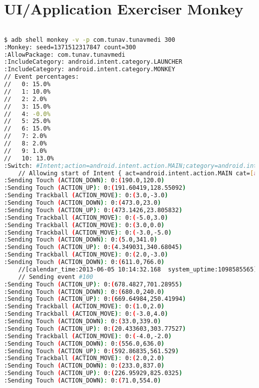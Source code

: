 \appendix

\chapter{UI/Application Exerciser Monkey}
\label{chptr:monkey}

\begin{lstlisting}[language=bash, label=lst:adb_monkey, caption=Utilisation de l'UI/Application Exerciser Monkey]

$ adb shell monkey -v -p com.tunav.tunavmedi 300
:Monkey: seed=1371512317847 count=300
:AllowPackage: com.tunav.tunavmedi
:IncludeCategory: android.intent.category.LAUNCHER
:IncludeCategory: android.intent.category.MONKEY
// Event percentages:
//   0: 15.0%
//   1: 10.0%
//   2: 2.0%
//   3: 15.0%
//   4: -0.0%
//   5: 25.0%
//   6: 15.0%
//   7: 2.0%
//   8: 2.0%
//   9: 1.0%
//   10: 13.0%
:Switch: #Intent;action=android.intent.action.MAIN;category=android.intent.category.LAUNCHER;launchFlags=0x10200000;component=com.tunav.tunavmedi/.activity.MainActivity;end
    // Allowing start of Intent { act=android.intent.action.MAIN cat=[android.intent.category.LAUNCHER] cmp=com.tunav.tunavmedi/.activity.MainActivity } in package com.tunav.tunavmedi
:Sending Touch (ACTION_DOWN): 0:(190.0,120.0)
:Sending Touch (ACTION_UP): 0:(191.60419,128.55092)
:Sending Trackball (ACTION_MOVE): 0:(3.0,-3.0)
:Sending Touch (ACTION_DOWN): 0:(473.0,23.0)
:Sending Touch (ACTION_UP): 0:(473.1426,23.805832)
:Sending Trackball (ACTION_MOVE): 0:(-5.0,3.0)
:Sending Trackball (ACTION_MOVE): 0:(3.0,0.0)
:Sending Trackball (ACTION_MOVE): 0:(-3.0,-5.0)
:Sending Touch (ACTION_DOWN): 0:(5.0,341.0)
:Sending Touch (ACTION_UP): 0:(4.349031,340.68045)
:Sending Trackball (ACTION_MOVE): 0:(2.0,-3.0)
:Sending Touch (ACTION_DOWN): 0:(611.0,766.0)
    //[calendar_time:2013-06-05 10:14:32.168  system_uptime:1098585565]
    // Sending event #100
:Sending Touch (ACTION_UP): 0:(678.4827,701.28955)
:Sending Touch (ACTION_DOWN): 0:(680.0,240.0)
:Sending Touch (ACTION_UP): 0:(669.64984,250.41994)
:Sending Trackball (ACTION_MOVE): 0:(1.0,2.0)
:Sending Trackball (ACTION_MOVE): 0:(-3.0,4.0)
:Sending Touch (ACTION_DOWN): 0:(33.0,339.0)
:Sending Touch (ACTION_UP): 0:(20.433603,303.77527)
:Sending Trackball (ACTION_MOVE): 0:(-4.0,-2.0)
:Sending Touch (ACTION_DOWN): 0:(556.0,636.0)
:Sending Touch (ACTION_UP): 0:(592.86835,561.529)
:Sending Trackball (ACTION_MOVE): 0:(2.0,2.0)
:Sending Touch (ACTION_DOWN): 0:(233.0,837.0)
:Sending Touch (ACTION_UP): 0:(226.95929,825.0325)
:Sending Touch (ACTION_DOWN): 0:(71.0,554.0)

\end{lstlisting}
